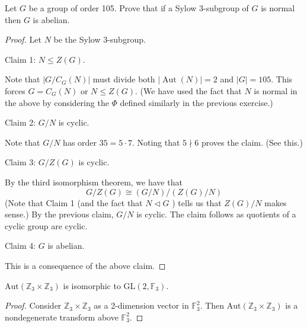 \begin{exercise}
Let $G$ be a group of order 105. Prove that if a Sylow 3-subgroup of $G$ is normal then $G$ is abelian.
\end{exercise}
\begin{proof}
Let $N$ be the Sylow 3-subgroup.

Claim 1: $N \leq Z(G)$.

Note that $\left|G / C_G(N)\right|$ must divide both $|\operatorname{Aut}(N)|=2$ and $|G|=105$. This forces $G=C_G(N)$ or $N \leq Z(G)$.
(We have used the fact that $N$ is normal in the above by considering the $\Phi$ defined similarly in the previous exercise.)

Claim 2: $G / N$ is cyclic.

Note that $G / N$ has order $35=5 \cdot 7$. Noting that $5 \nmid  6$ proves the claim. (See this.)

Claim 3: $G / Z(G)$ is cyclic.

By the third isomorphism theorem, we have that
\[
G / Z(G) \cong(G / N) /(Z(G) / N)
\]
(Note that Claim 1 (and the fact that $N \triangleleft G$ ) tells us that $Z(G) / N$ makes sense.) By the previous claim, $G / N$ is cyclic. The claim follows as quotients of a cyclic group are cyclic.

Claim 4: $G$ is abelian.

This is a consequence of the above claim.

\end{proof}

\begin{lemma}
$\mathrm{Aut}(\mathbb{Z}_{3}\times \mathbb{Z}_{3})$ is isomorphic to $\mathrm{GL}(2,\mathbb{F}_{3})$.
\end{lemma}
\begin{proof}
Consider $\mathbb{Z}_{3}\times \mathbb{Z}_{3}$ as a 2-dimension vector in $\mathbb{F}_{3}^2$. Then $\mathrm{Aut}(\mathbb{Z}_{3}\times \mathbb{Z}_{3})$ is a nondegenerate transform above $\mathbb{F}_{3}^2$.
\end{proof}

